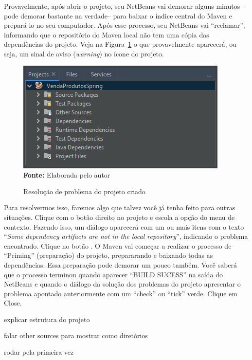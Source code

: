 Provavelmente, após abrir o projeto, seu NetBeans vai demorar alguns minutos --pode demorar bastante na verdade-- para baixar o índice central do Maven e prepará-lo no seu computador. Após esse processo, seu NetBeans vai ``reclamar'', informando que o repositório do Maven local não tem uma cópia das dependências do projeto. Veja na Figura~\ref{fig:cap10ConfProjeto03} o que provavelmente aparecerá, ou seja, um sinal de aviso (\textit{warning}) no ícone do projeto.

\FloatBarrier
\begin{figure}[!htbp]
    \centering
    \caption{Resolução de problema do projeto criado}
    \includegraphics[scale=1]{imagens/cap10ConfProjeto03}
    \\\textbf{Fonte:} Elaborada pelo autor
    \label{fig:cap10ConfProjeto03}
\end{figure}
\FloatBarrier

Para resolvermos isso, faremos algo que talvez você já tenha feito para outras situações. Clique com o botão direito no projeto e escola a opção  do menu de contexto. Fazendo isso, um diálogo aparecerá com um ou mais itens com o texto ``\textit{Some dependency artifacts are not in the local repository}'', indicando o problema encontrado. Clique no botão . O Maven vai começar a realizar o processo de ``Priming'' (preparação) do projeto, prepararando e baixando todas as dependências. Essa preparação pode demorar um pouco também. Você saberá que o processo terminou quando aparecer ``BUILD SUCESS'' na saída do NetBeans e quando o diálogo da solução dos problemas do projeto apresentar o problema apontado anteriormente com um ``check'' ou ``tick'' verde. Clique em Close.

explicar estrutura do projeto

falar  other sources para mostrar como diretórios

rodar pela primeira vez

